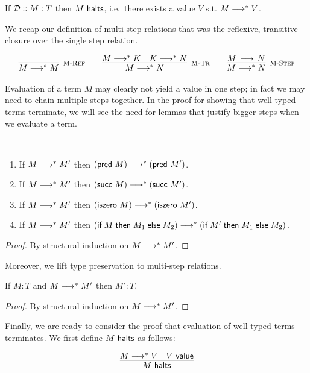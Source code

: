 \begin{theorem}
If $\mathbin{{\mathcal{D}} :: M : T }$ then $M ~\mathsf{halts}$, i.e.~there exists a value $V$ s.t. $M
\longrightarrow^* V$.
\end{theorem}

We recap our definition of multi-step relations that was the
reflexive, transitive closure over the single step relation.

\[
\begin{array}{c@{\qquad}c@{\qquad}c}
\infer[\MRef]{M \MSteps M}{} &
\infer[\MTr]{M \MSteps N}{M \MSteps K & K \MSteps N} &
\infer[\MStep]{M \MSteps N}{M \Steps N}
\end{array}
\]

Evaluation of a term $M$ may clearly not yield a value in one step; in fact we may need to chain multiple steps together.
In the proof for showing that well-typed terms terminate, we will see the need for lemmas that justify bigger steps when we evaluate a term.

\begin{lemma}~
  \begin{enumerate}
  \item If $M \longrightarrow^* M'$ then $(\textsf{pred}~M) \longrightarrow^* (\textsf{pred}~M')$.
  \item If $M \longrightarrow^* M'$ then $(\textsf{succ}~M) \longrightarrow^* (\textsf{succ}~M')$.
  \item If $M \longrightarrow^* M'$ then $(\textsf{iszero}~M) \longrightarrow^* (\textsf{iszero}~M')$.
  \item If $M \longrightarrow^* M'$ then $(\textsf{if\;} M \textsf{\;then\;} M_1 \textsf{\;else\;} M_2) \longrightarrow^* (\textsf{if\;} M' \textsf{\;then\;} M_1 \textsf{\;else\;} M_2)$.
  \end{enumerate}
\end{lemma}
\begin{proof}
By structural induction  on $M \longrightarrow^* M'$.
\end{proof}

Moreover, we lift type preservation to multi-step relations.

\begin{lemma}
If $M : T$ and $M \longrightarrow^* M'$ then $M':T$.
\end{lemma}
\begin{proof}
By structural induction on $M \longrightarrow^* M'$.
\end{proof}

Finally, we are ready to consider the proof that evaluation of well-typed terms
terminates. We first define $M ~\mathsf{halts}$ as follows:

\[
\begin{array}{c}
\infer{M \Halts}{M \MSteps V & V \Value }
\end{array}
\]

